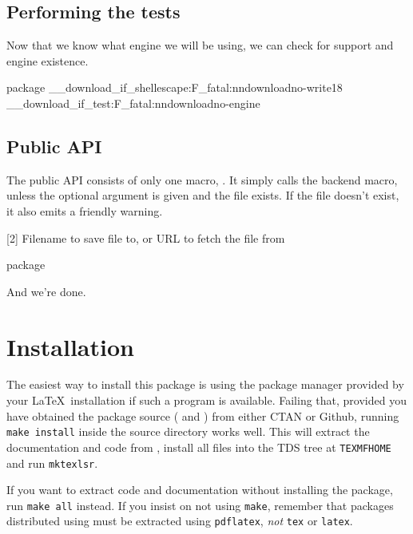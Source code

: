 \documentclass{skdoc}
\begin{document}
    \subsection{Performing the tests}
    Now that we know what engine we will be using, we can check for
     support and engine existence.
\begin{MacroCode}{package}
\__download_if_shellescape:F{\msg_fatal:nn{download}{no-write18}}
\__download_if_test:F{\msg_fatal:nn{download}{no-engine}}
\end{MacroCode}

    \subsection{Public API}
    The public API consists of only one macro, . It
    simply calls the backend macro, unless the optional argument
    is given and the file exists. If the file doesn't exist, it
    also emits a friendly warning.
    \begin{macro}{\download}[2]
        {Filename to save file to, or }
        {URL to fetch the file from}
\begin{MacroCode}{package}
\DeclareDocumentCommand{}
\end{MacroCode}
    \end{macro}
    
    And we're done.

    \Finale
    \section{Installation}
    The easiest way to install this package is using the package
    manager provided by your \LaTeX\ installation if such a program
    is available. Failing that, provided you have obtained the package
    source ( and ) from either CTAN
    or Github, running \texttt{make install} inside the source directory
    works well. This will extract the documentation and code from
    , install all files into the TDS tree at
    \texttt{TEXMFHOME} and run \texttt{mktexlsr}.

    If you want to extract code and documentation without installing
    the package, run \texttt{make all} instead. If you insist on not
    using \texttt{make}, remember that packages distributed using
     must be extracted using \texttt{pdflatex}, \emph{not}
    \texttt{tex} or \texttt{latex}.

    \PrintChanges
    \PrintIndex
    \printbibliography
\end{document}
